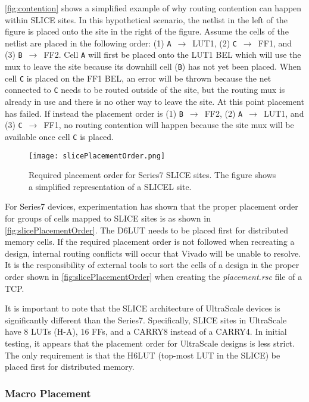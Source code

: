 \autoref{fig:contention} shows a simplified example of why routing contention
can happen within SLICE sites. In this hypothetical scenario, the netlist in
the left of the figure is  placed onto the site in the right of the 
figure. Assume the cells of the netlist are placed in the following
order: (1) \texttt{A} $\,\to\,$ LUT1, (2) \texttt{C} $\,\to\,$ FF1, and (3)
\texttt{B} $\,\to\,$ FF2. Cell \texttt{A} will first be placed onto the LUT1 BEL
which will use the mux to leave the site because its downhill cell (\texttt{B})
has not yet been placed. When cell \texttt{C} is placed on the FF1 BEL, an error
will be thrown because the net connected to \texttt{C} needs to be routed
outside of the site, but the routing mux is already in use and there is no
other way to leave the site. At this point placement has failed. If instead the
placement order is (1) \texttt{B} $\,\to\,$ FF2, (2) \texttt{A} $\,\to\,$ LUT1,
and (3) \texttt{C} $\,\to\,$ FF1, no routing contention will happen because the
site mux will be available once cell \texttt{C} is placed.

\begin{figure}[t!]
  \centering
  \texttt{[image: slicePlacementOrder.png]}
  \caption{Required placement order for Series7 SLICE sites. The figure shows a
  simplified representation of a SLICEL site.}
  \label{fig:slicePlacementOrder}
\end{figure}


For Series7 devices, experimentation has shown that the proper placement order
for groups of cells mapped to SLICE sites is as shown in
\autoref{fig:slicePlacementOrder}. The D6LUT needs to be placed first for
distributed memory cells. If the required placement order is not followed when
recreating a design, internal routing conflicts will occur that Vivado will be
unable to resolve. It is the responsibility of external tools to sort the cells
of a design in the proper order shown in \autoref{fig:slicePlacementOrder} when
creating the \textit{placement.rsc} file of a TCP.

It is important to note that the SLICE architecture of UltraScale
devices is significantly different than the Series7. Specifically, SLICE sites
in UltraScale have 8 LUTs (H-A), 16 FFs, and a CARRY8 instead of a CARRY4. In
initial testing, it appears that the placement order for UltraScale designs is
less strict. The only requirement is that the H6LUT (top-most LUT in the SLICE)
be placed first for distributed memory.

\subsubsection{Macro Placement} \label{sec:macroPlacement}

